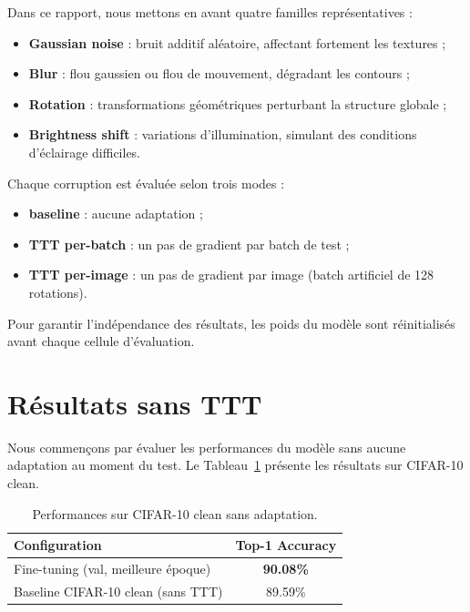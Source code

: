 \documentclass[12pt,a4paper]{report}
\begin{document}
	Dans ce rapport, nous mettons en avant quatre familles représentatives :
	
	\begin{itemize}
		\item \textbf{Gaussian noise} : bruit additif aléatoire, affectant fortement les textures ;
		\item \textbf{Blur} : flou gaussien ou flou de mouvement, dégradant les contours ;
		\item \textbf{Rotation} : transformations géométriques perturbant la structure globale ;
		\item \textbf{Brightness shift} : variations d’illumination, simulant des conditions d’éclairage difficiles.
	\end{itemize}
	
	Chaque corruption est évaluée selon trois modes :
	\begin{itemize}
		\item \textbf{baseline} : aucune adaptation ;
		\item \textbf{TTT per-batch} : un pas de gradient par batch de test ;
		\item \textbf{TTT per-image} : un pas de gradient par image (batch artificiel de 128 rotations).
	\end{itemize}
	
	Pour garantir l’indépendance des résultats, les poids du modèle sont réinitialisés avant chaque cellule d’évaluation.
	
	\section{Résultats sans TTT}
	Nous commençons par évaluer les performances du modèle sans aucune adaptation au moment du test.  
	Le Tableau~\ref{tab:clean_baseline} présente les résultats sur CIFAR-10 clean.
	
	\begin{table}[H]
		\centering
		\begin{tabular}{lc}
			\toprule
			\textbf{Configuration} & \textbf{Top-1 Accuracy} \\
			\midrule
			Fine-tuning (val, meilleure époque) & \textbf{90.08\%} \\
			Baseline CIFAR-10 clean (sans TTT) & 89.59\% \\
			\bottomrule
		\end{tabular}
		\caption{Performances sur CIFAR-10 clean sans adaptation.}
		\label{tab:clean_baseline}
	\end{table}
	
\end{document}

